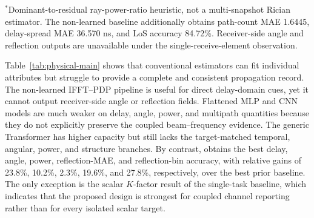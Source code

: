 \begin{table}[!t]
\vspace{2pt}

{\scriptsize $^{\ast}$Dominant-to-residual ray-power-ratio heuristic, not a multi-snapshot Rician
estimator. The non-learned baseline additionally obtains path-count MAE 1.6445, delay-spread MAE
36.570 ns, and LoS accuracy 84.72\%. Receiver-side angle and reflection outputs are unavailable
under the single-receive-element observation.}
\end{table}

Table~\ref{tab:physical-main} shows that conventional estimators can fit individual attributes but
struggle to provide a complete and consistent propagation record. The non-learned IFFT--PDP pipeline
is useful for direct delay-domain cues, yet it cannot output receiver-side angle or reflection fields.
Flattened MLP and CNN models are much weaker on delay, angle, power, and multipath quantities because
they do not explicitly preserve the coupled beam--frequency evidence. The generic Transformer has
higher capacity but still lacks the target-matched temporal, angular, power, and structure branches.
By contrast, \model{} obtains the best delay, angle, power, reflection-MAE, and reflection-bin
accuracy, with relative gains of 23.8\%, 10.2\%, 2.3\%, 19.6\%, and 27.8\%, respectively, over the
best prior baseline. The only exception is the scalar $K$-factor result of the single-task baseline,
which indicates that the proposed design is strongest for coupled channel reporting rather than for
every isolated scalar target.

